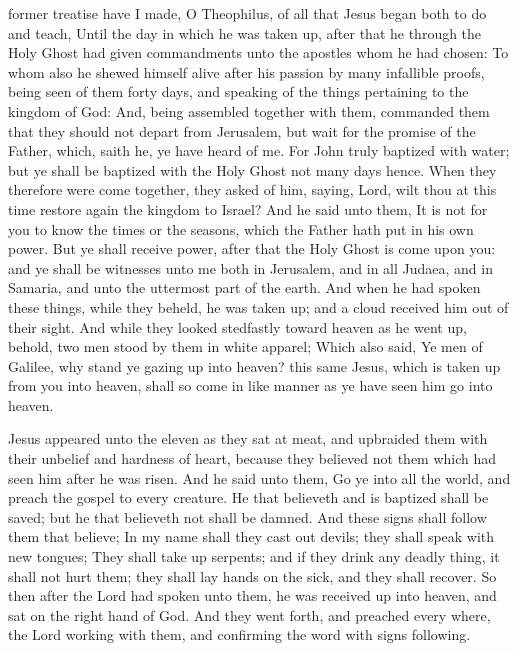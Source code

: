  former treatise have I made, O Theophilus, of all that Jesus began both to do and teach, Until the day in which he was taken up, after that he through the Holy Ghost had given commandments unto the apostles whom he had chosen: To whom also he shewed himself alive after his passion by many infallible proofs, being seen of them forty days, and speaking of the things pertaining to the kingdom of God: And, being assembled together with them, commanded them that they should not depart from Jerusalem, but wait for the promise of the Father, which, saith he, ye have heard of me. For John truly baptized with water; but ye shall be baptized with the Holy Ghost not many days hence. When they therefore were come together, they asked of him, saying, Lord, wilt thou at this time restore again the kingdom to Israel? And he said unto them, It is not for you to know the times or the seasons, which the Father hath put in his own power. But ye shall receive power, after that the Holy Ghost is come upon you: and ye shall be witnesses unto me both in Jerusalem, and in all Judaea, and in Samaria, and unto the uttermost part of the earth. And when he had spoken these things, while they beheld, he was taken up; and a cloud received him out of their sight. And while they looked stedfastly toward heaven as he went up, behold, two men stood by them in white apparel; Which also said, Ye men of Galilee, why stand ye gazing up into heaven? this same Jesus, which is taken up from you into heaven, shall so come in like manner as ye have seen him go into heaven.


 Jesus appeared unto the eleven as they sat at meat, and upbraided them with their unbelief and hardness of heart, because they believed not them which had seen him after he was risen. And he said unto them, Go ye into all the world, and preach the gospel to every creature. He that believeth and is baptized shall be saved; but he that believeth not shall be damned. And these signs shall follow them that believe; In my name shall they cast out devils; they shall speak with new tongues; They shall take up serpents; and if they drink any deadly thing, it shall not hurt them; they shall lay hands on the sick, and they shall recover. So then after the Lord had spoken unto them, he was received up into heaven, and sat on the right hand of God. And they went forth, and preached every where, the Lord working with them, and confirming the word with signs following.

